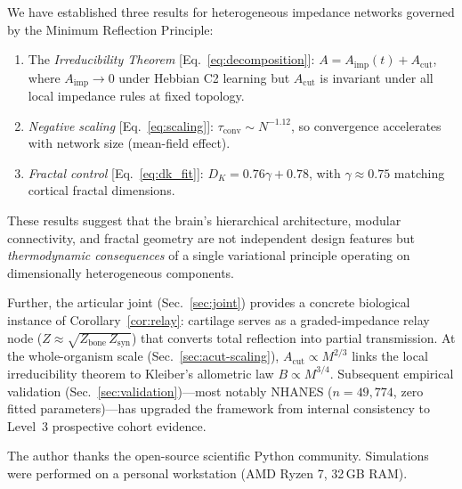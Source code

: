 \documentclass[aps,pre,twocolumn,superscriptaddress,floatfix]{revtex4-2}
\newcommand{\Aimp}{A_{\text{imp}}}
\newcommand{\Acut}{A_{\text{cut}}}
\begin{document}
We have established three results for heterogeneous impedance
networks governed by the Minimum Reflection Principle:

\begin{enumerate}
\item
The \emph{Irreducibility Theorem}
[Eq.~\eqref{eq:decomposition}]:
$A = \Aimp(t) + \Acut$,
where $\Aimp \to 0$ under Hebbian C2 learning but $\Acut$ is
invariant under all local impedance rules at fixed topology.

\item
\emph{Negative scaling}
[Eq.~\eqref{eq:scaling}]:
$\tau_{\text{conv}} \sim N^{-1.12}$,
so convergence accelerates with network size (mean-field effect).

\item
\emph{Fractal control}
[Eq.~\eqref{eq:dk_fit}]:
$D_K = 0.76\gamma + 0.78$,
with $\gamma \approx 0.75$ matching cortical fractal dimensions.
\end{enumerate}

These results suggest that the brain's hierarchical architecture,
modular connectivity, and fractal geometry are not independent
design features but \emph{thermodynamic consequences} of a single
variational principle operating on dimensionally heterogeneous
components.

Further, the articular joint (Sec.~\ref{sec:joint}) provides a
concrete biological instance of Corollary~\ref{cor:relay}:
cartilage serves as a graded-impedance relay node
($Z \approx \sqrt{Z_{\text{bone}}\,Z_{\text{syn}}}$)
that converts total reflection into partial transmission.
At the whole-organism scale (Sec.~\ref{sec:acut-scaling}),
$\Acut \propto M^{2/3}$ links the local irreducibility theorem
to Kleiber's allometric law $B \propto M^{3/4}$.
Subsequent empirical validation (Sec.~\ref{sec:validation})---most
notably NHANES ($n = 49{,}774$, zero fitted parameters)---has
upgraded the framework from internal consistency
to Level~3 prospective cohort evidence.

\begin{acknowledgments}
The author thanks the open-source scientific Python community.
Simulations were performed on a personal workstation
(AMD Ryzen 7, 32\,GB RAM).
\end{acknowledgments}
\end{document}
